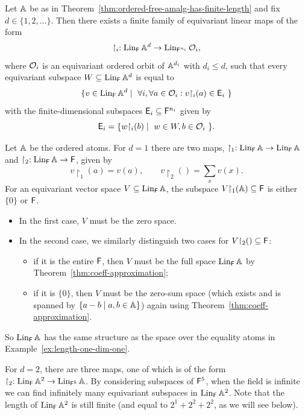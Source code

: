 \begin{theorem}\label{thm:coeff-approximation}
    Let $\A$ be as in Theorem~\ref{thm:ordered-free-amalg-has-finite-length} and fix $d \in \{1, 2, \dots\}$. 
    Then there exists a finite family of equivariant linear maps of the form
    \[
        \restriction_i : \Lin_\FF \A^d \to \Lin_{\FF^{n_i}} \cal O_i,
    \]
    where $\cal O_i$ is an equivariant ordered orbit of $\A^{d_i}$ with $d_i \leq d$, 
    such that every equivariant subspace $W \subseteq \Lin_\FF \A^d$ is equal to
    \[
        \{v \in \Lin_\FF \A^d \mid\ \forall i, \forall a \in \cal O_i : v{\restriction_i}(a) \in \EE_i\ \}
    \]
    with the finite-dimensional subspaces $\EE_i \subseteq \FF^{n_i}$ given by
    \[
        \EE_i = \{w {\restriction_i}(b) \mid\ w \in W, b \in \cal O_i\ \}.
    \]
\end{theorem}

\begin{example}
    Let $\A$ be the ordered atoms. 
    For $d = 1$ there are two maps, $\restriction_{1} : \Lin_\FF \A \to \Lin_\FF \A$ and $\restriction_{2} : \Lin_\FF \A \to \FF$, given by  
    \[
        v {\restriction_1} (a) = v(a), \qquad
        v {\restriction_2} () = \sum_{x} v(x).
    \]
    For an equivariant vector space $V \subseteq \Lin_\FF \A$, the subspace $V {\restriction_1}(\A) \subseteq \FF$ is either $\{0\}$ or $\FF$.
    \begin{itemize}
        \item In the first case, $V$ must be the zero space.
        \item In the second case, we similarly distinguish two cases for $V {\restriction_2}() \subseteq \FF$:
        \begin{itemize}
            \item if it is the entire $\FF$, then $V$ must be the full space $\Lin_\FF \A$ by Theorem~\ref{thm:coeff-approximation};
            \item if it is $\{0\}$, then $V$ must be the zero-sum space (which exists and is spanned by $\{a - b \mid a, b \in \A\}$) again using Theorem~\ref{thm:coeff-approximation}.
        \end{itemize}
    \end{itemize}
    So $\Lin_\FF \A$ has the same structure as the space over the equality atoms in Example~\ref{ex:length-one-dim-one}.

    For $d = 2$, there are three maps, one of which is of the form $\restriction_2 : \Lin_\FF \A^2 \to \Lin_{\FF^5} \A$. 
    By considering subspaces of $\FF^5$, when the field is infinite we can find infinitely many equivariant subspaces in $\Lin_\FF \A^2$.
    Note that the length of $\Lin_\FF \A^2$ is still finite (and equal to $2^1 + 2^2 + 2^2$, as we will see below).
\lipicsEnd\end{example}


